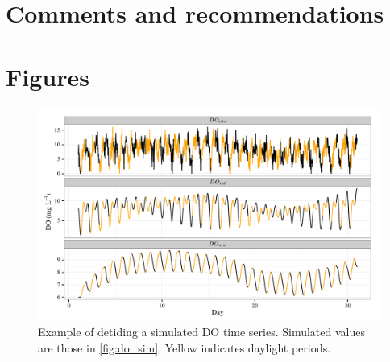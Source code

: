 \documentclass[letterpaper,12pt,oneside]{article}\usepackage[]{graphicx}\usepackage[]{color}
\makeatletter
\def\maxwidth{ %
  \ifdim\Gin@nat@width>\linewidth
    \linewidth
  \else
    \Gin@nat@width
  \fi
}
\newenvironment{knitrout}{}{} %
\makeatother
\begin{document}

\section{Comments and recommendations}

\begin{singlespace}


\end{singlespace}
\clearpage


\section{Figures}

\centering\vspace*{\fill}
\begin{knitrout}
\color{fgcolor}\begin{figure}[!ht]


{\centering \includegraphics[width=\maxwidth]{figure/do_dtd} 

}

\caption[Example of detiding a simulated \ac{DO} time series]{Example of detiding a simulated \ac{DO} time series.  Simulated values are those in \cref{fig:do_sim}.  Yellow indicates daylight periods.\label{fig:do_dtd}}
\end{figure}


\end{knitrout}
\vfill
\clearpage
\end{document}
